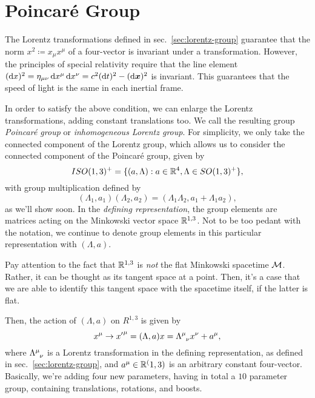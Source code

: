 \section{Poincaré Group}
The Lorentz transformations defined in sec.~\ref{sec:lorentz-group} guarantee that the norm $x^2 \coloneq x_\mu x^\mu$ of a four-vector is invariant under a transformation. However, the principles of special relativity require that the line element $(\mathop{}\!\mathrm{d} x)^2 = \eta_{\mu\nu} \mathop{}\!\mathrm{d} x^\mu \mathop{}\!\mathrm{d} x^\nu = c^2 (\mathop{}\!\mathrm{d} t)^2 - (\mathop{}\!\mathrm{d} \boldsymbol{x})^2$ is invariant. This guarantees that the speed of light is the same in each inertial frame. 

In order to satisfy the above condition, we can enlarge the Lorentz transformations, adding constant translations too. We call the resulting group \emph{Poincaré group} or \emph{inhomogeneous Lorentz group}. For simplicity, we only take the connected component of the Lorentz group, which allows us to consider the connected component of the Poincaré group, given by
\begin{equation}
    ISO(1,3)^+ = \{ (a,\Lambda) : a \in \mathbb{R}^4, \Lambda \in SO(1,3)^+ \},
\end{equation}
with group multiplication defined by
\begin{equation}
    (\Lambda_1, a_1) (\Lambda_2, a_2) = (\Lambda_1 \Lambda_2, a_1 + \Lambda_1 a_2),
\end{equation}
as we'll show soon. In the \emph{defining representation}, the group elements are matrices acting on the Minkowski vector space $\mathbb{R}^{1,3}$. Not to be too pedant with the notation, we continue to denote group elements in this particular representation with $(\Lambda,a)$.

\begin{remark}
    Pay attention to the fact that $\mathbb{R}^{1,3}$ is \emph{not} the flat Minkowski spacetime $\mathcal{M}$. Rather, it can be thought as its tangent space at a point. Then, it's a case that we are able to identify this tangent space with the spacetime itself, if the latter is flat.
\end{remark}

Then, the action of $(\Lambda,a)$ on $R^{1,3}$ is given by
\begin{equation}\label{eq:poincare-definition}
    x^\mu \to {x'}^\mu = (\Lambda, a) x = \tensor{\Lambda}{^\mu_\nu} x^\nu + a^\mu ,
\end{equation}
where $\tensor{\Lambda}{^\mu_\nu}$ is a Lorentz transformation in the defining representation, as defined in sec.~\ref{sec:lorentz-group}, and $a^\mu \in \mathbb{R}^(1,3)$ is an arbitrary constant four-vector. Basically, we're adding four new parameters, having in total a $10$ parameter group, containing translations, rotations, and boosts.

